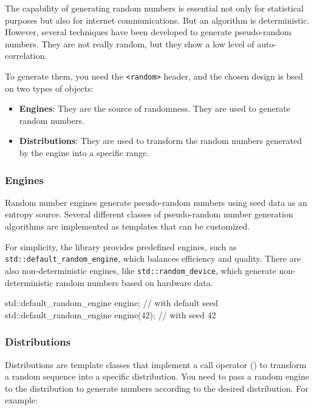 The capability of generating random numbers is essential not only for statistical purposes but also
for internet communications. But an algorithm is deterministic. However, several techniques have
been developed to generate pseudo-random numbers. They are not really random, but they show
a low level of auto-correlation.

To generate them, you need the \texttt{<random>} header, and the chosen design is bsed on two types of objects:
\begin{itemize}
    \item \textbf{Engines}: They are the source of randomness. They are used to generate random numbers.
    \item \textbf{Distributions}: They are used to transform the random numbers generated by the engine into a specific range.
\end{itemize}

\subsubsection*{Engines}
Random number engines generate pseudo-random numbers using seed data as an entropy
source. Several different classes of pseudo-random number generation algorithms are
implemented as templates that can be customized. 

For simplicity, the library provides predefined engines, such as \texttt{std::default\_random\_engine},
which balances efficiency and quality. There are also non-deterministic engines, like \texttt{std::random\_device}, which generate non-deterministic random numbers based on hardware
data.

\begin{exampleblock}
    \begin{codeblock}[language=C++]
std::default_random_engine engine;  // with default seed
std::default_random_engine engine(42);  // with seed 42
    \end{codeblock}
\end{exampleblock}

\subsubsection*{Distributions}

Distributions are template classes that implement a call operator () to transform a random
sequence into a specific distribution. You need to pass a random engine to the distribution to
generate numbers according to the desired distribution. For example:

